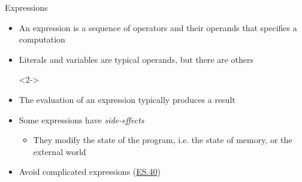 \begin{frame}[fragile]{Expressions}

  \begin{itemize}
  \item An expression is a sequence of operators and their operands
    that specifies a computation
  \item Literals and variables are typical operands, but there are others

  \begin{codeblock}<2->{
}\end{codeblock}

\item<8-> The evaluation of an expression typically produces a result
\item<9-> Some expressions have \textit{side-effects}
  \begin{itemize}
  \item They modify the state of the program, i.e. the state of memory, or the
    external world
  \end{itemize}
\item<10-> Avoid complicated expressions
  (\href{https://isocpp.github.io/CppCoreGuidelines/CppCoreGuidelines#es40-avoid-complicated-expressions}{ES.40})
\end{itemize}

\end{frame}

